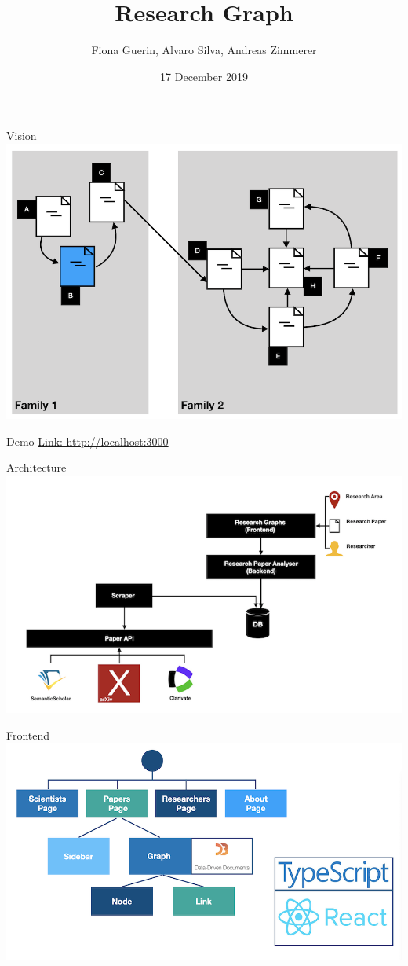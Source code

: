 \documentclass{beamer}
\title[Research Graph]{Research Graph}
\author[Guerin, Silva, Zimmerer]{Fiona Guerin, Alvaro Silva, Andreas Zimmerer}
\institute{Technical University of Munich}
\date{17 December 2019}
\begin{document}
\maketitle

\begin{frame}{Vision}
    \includegraphics{img_02.png}
\end{frame}

\begin{frame}{Demo}
\url{Link: http://localhost:3000}
\end{frame}

\begin{frame}{Architecture}
    \includegraphics{img_03.png}
\end{frame}

\begin{frame}{Frontend}
    \includegraphics{img_06.png}
\end{frame}
\end{document}

